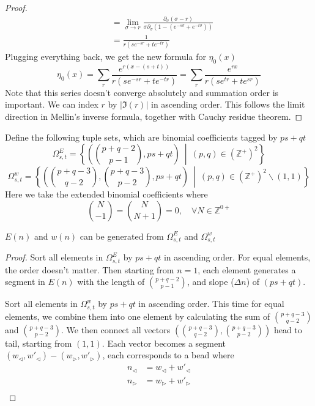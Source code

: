 \documentclass[]{article}
\begin{document}
\begin{proof}
\begin{align*}
&= \lim_{\sigma\to r} \frac{\partial_\sigma(\sigma - r)}{\sigma\partial_\sigma(1- (e^{-s\sigma} + e^{-t\sigma}))} \\
    &= \frac{1}{r(s e^{-sr} + t e^{-tr})}
\end{align*}
Plugging everything back, we get the new formula for $\eta_0(x)$
\[
\eta_0(x) = \sum_r \frac{e^{r(x - (s +t))}}{r(s e^{-sr} + t e^{-tr})}  = \sum_r \frac{e^{rx}}{r(s e^{tr} + t e^{sr})}
\]
Note that this series doesn't converge absolutely and summation order is important. We can index $r$ by $|\mathfrak{I}(r)|$ in ascending order. This follows the limit direction in Mellin's inverse formula, together with Cauchy residue theorem.

\end{proof}

\vspace{1cm}
\begin{definition}[Pascal]
	Define the following tuple sets, which are binomial coefficients tagged by $ps+qt$
	\[
	\Omega^E_{s,t} = \left\{\left(\binom{p+q-2}{p-1}, ps+qt \right) \ \middle|\ (p,q)\in(\mathbb{Z}^+)^2 \right\}
	\]
	\[
	\Omega^w_{s,t} = \left\{\left(\binom{p+q-3}{q-2}, \binom{p+q-3}{p-2}, ps+qt \right) \ \middle|\ (p,q)\in(\mathbb{Z}^+)^2 \backslash (1,1) \right\}
	\]
	Here we take the extended binomial coefficients where 
	\[
	\binom{N}{-1} = \binom{N}{N+1} = 0, \quad\forall N \in \mathbb{Z}^{0+}
	\]
\end{definition}

\vspace{1cm}
\begin{lemma}[Pascal]
	$E(n)$ and $w(n)$ can be generated from $\Omega^E_{s,t}$ and $\Omega^w_{s,t}$
\end{lemma}
\begin{proof}

Sort all elements in $\Omega^E_{s,t}$ by $ps+qt$ in ascending order. For equal elements, the order doesn't matter. Then starting from $n=1$, each element generates a segment in $E(n)$ with the length of $\binom{p+q-2}{p-1}$, and slope ($\Delta n$) of $(ps+qt)$.


Sort all elements in $\Omega^w_{s,t}$ by $ps+qt$ in ascending order. This time for equal elements, we combine them into one element by calculating the sum of $\binom{p+q-3}{q-2}$ and $\binom{p+q-3}{p-2}$. We then connect all vectors $\left(\binom{p+q-3}{q-2}, \binom{p+q-3}{p-2}\right)$ head to tail, starting from $(1,1)$. Each vector becomes a segment $(w_{\triangleleft}, w'_{\triangleleft}) - (w_{\triangleright}, w'_{\triangleright})$, each corresponds to a bead where
\begin{align*}
	n_\triangleleft &= w_{\triangleleft} + w'_{\triangleleft} \\
	n_\triangleright &= w_{\triangleright} + w'_{\triangleright} \\
\end{align*}

\end{proof}
\end{document}
